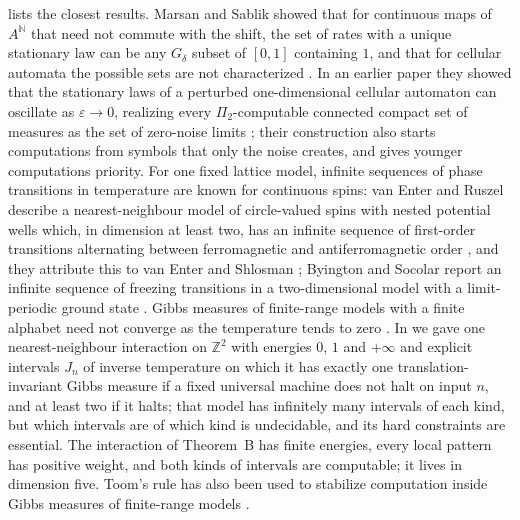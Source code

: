\documentclass[11pt]{article}
\theoremstyle{plain}
\theoremstyle{definition}
\theoremstyle{remark}
\newcommand{\Z}{\mathbb Z}
\newcommand{\N}{\mathbb N}
\newcommand{\eps}{\varepsilon}
\begin{document}
 lists the closest results. Marsan and Sablik showed that for continuous maps of $A^{\N}$ that need not commute with the shift, the set of rates with a unique stationary law can be any $G_\delta$ subset of $[0,1]$ containing $1$, and that for cellular automata the possible sets are not characterized \cite{MS25}. In an earlier paper they showed that the stationary laws of a perturbed one-dimensional cellular automaton can oscillate as $\eps\to0$, realizing every $\Pi_2$-computable connected compact set of measures as the set of zero-noise limits \cite{MS24}; their construction also starts computations from symbols that only the noise creates, and gives younger computations priority. For one fixed lattice model, infinite sequences of phase transitions in temperature are known for continuous spins: van Enter and Ruszel describe a nearest-neighbour model of circle-valued spins with nested potential wells which, in dimension at least two, has an infinite sequence of first-order transitions alternating between ferromagnetic and antiferromagnetic order \cite[Section~2]{vER07}, and they attribute this to van Enter and Shlosman \cite{vES05}; Byington and Socolar report an infinite sequence of freezing transitions in a two-dimensional model with a limit-periodic ground state \cite{BS12}. Gibbs measures of finite-range models with a finite alphabet need not converge as the temperature tends to zero \cite{CH10,GST}. In \cite{DMhard} we gave one nearest-neighbour interaction on $\Z^2$ with energies $0$, $1$ and $+\infty$ and explicit intervals $J_n$ of inverse temperature on which it has exactly one translation-invariant Gibbs measure if a fixed universal machine does not halt on input $n$, and at least two if it halts; that model has infinitely many intervals of each kind, but which intervals are of which kind is undecidable, and its hard constraints are essential. The interaction of Theorem~B has finite energies, every local pattern has positive weight, and both kinds of intervals are computable; it lives in dimension five. Toom's rule has also been used to stabilize computation inside Gibbs measures of finite-range models \cite{MT25}.
\end{document}
